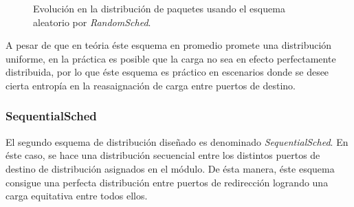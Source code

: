 \begin{figure}[th!]
\centering
{}
\caption{Evolución en la distribución de paquetes usando el esquema aleatorio por \emph{RandomSched}.}
\label{fig:RandomSched}
\end{figure}

A pesar de que en teória éste esquema en promedio promete una distribución uniforme, en la práctica es posible que la carga no sea en efecto perfectamente distribuida, por lo que éste esquema es práctico en escenarios donde se desee cierta entropía en la reasaignación de carga entre puertos de destino.

\subsubsection{SequentialSched}
El segundo esquema de distribución diseñado es denominado \emph{SequentialSched}. En éste caso, se hace una distribución secuencial entre los distintos puertos de destino de distribución asignados en el módulo. De ésta manera, éste esquema consigue una perfecta distribución entre puertos de redirección logrando una carga equitativa entre todos ellos.

